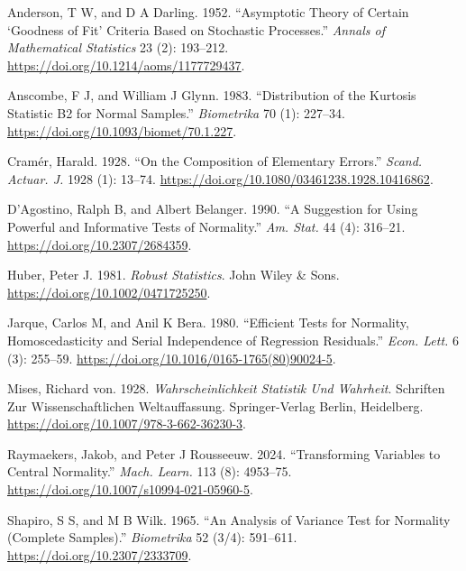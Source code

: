 \documentclass[
  a4paper,
]{article}
\newlength{\cslhangindent}
\newenvironment{CSLReferences}[2] %
 {\begin{list}{}{%
  \setlength{\itemindent}{0pt}
  \setlength{\leftmargin}{0pt}
  \setlength{\parsep}{0pt}
  \ifodd #1
   \setlength{\leftmargin}{\cslhangindent}
   \setlength{\itemindent}{-1\cslhangindent}
  \fi
  \setlength{\itemsep}{#2\baselineskip}}}
 {\end{list}}
\begin{document}
\label{refs}
\begin{CSLReferences}{1}{0}
Anderson, T W, and D A Darling. 1952. {``Asymptotic Theory of Certain
{`Goodness of Fit'} Criteria Based on Stochastic Processes.''}
\emph{Annals of Mathematical Statistics} 23 (2): 193--212.
\url{https://doi.org/10.1214/aoms/1177729437}.

Anscombe, F J, and William J Glynn. 1983. {``Distribution of the
Kurtosis Statistic B2 for Normal Samples.''} \emph{Biometrika} 70 (1):
227--34. \url{https://doi.org/10.1093/biomet/70.1.227}.

Cramér, Harald. 1928. {``On the Composition of Elementary Errors.''}
\emph{Scand. Actuar. J.} 1928 (1): 13--74.
\url{https://doi.org/10.1080/03461238.1928.10416862}.

D'Agostino, Ralph B, and Albert Belanger. 1990. {``A Suggestion for
Using Powerful and Informative Tests of Normality.''} \emph{Am. Stat.}
44 (4): 316--21. \url{https://doi.org/10.2307/2684359}.

Huber, Peter J. 1981. \emph{Robust Statistics}. John Wiley \& Sons.
\url{https://doi.org/10.1002/0471725250}.

Jarque, Carlos M, and Anil K Bera. 1980. {``Efficient Tests for
Normality, Homoscedasticity and Serial Independence of Regression
Residuals.''} \emph{Econ. Lett.} 6 (3): 255--59.
\url{https://doi.org/10.1016/0165-1765(80)90024-5}.

Mises, Richard von. 1928. \emph{Wahrscheinlichkeit Statistik Und
Wahrheit}. Schriften Zur Wissenschaftlichen Weltauffassung.
Springer-Verlag Berlin, Heidelberg.
\url{https://doi.org/10.1007/978-3-662-36230-3}.

Raymaekers, Jakob, and Peter J Rousseeuw. 2024. {``Transforming
Variables to Central Normality.''} \emph{Mach. Learn.} 113 (8):
4953--75. \url{https://doi.org/10.1007/s10994-021-05960-5}.

Shapiro, S S, and M B Wilk. 1965. {``An Analysis of Variance Test for
Normality (Complete Samples).''} \emph{Biometrika} 52 (3/4): 591--611.
\url{https://doi.org/10.2307/2333709}.

\end{CSLReferences}
\end{document}
